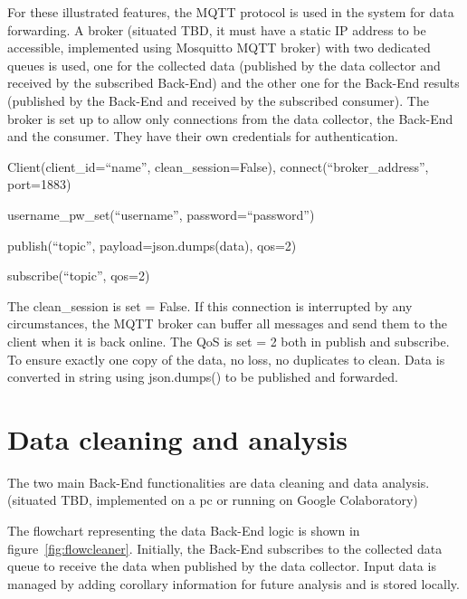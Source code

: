 For these illustrated features, the MQTT protocol is used in the system for data forwarding. A broker (situated TBD, it must have a static IP address to be accessible, implemented using Mosquitto MQTT broker) with two dedicated queues is used, one for the collected data (published by the data collector and received by the subscribed Back-End) and the other one for the Back-End results (published by the Back-End and received by the subscribed consumer).
The broker is set up to allow only connections from the data collector, the Back-End and the consumer. They have their own credentials for authentication.

Client(client\_id=``name'', clean\_session=False), connect(``broker\_address'', port=1883)

username\_pw\_set(``username'', password=``password'')

publish(``topic'', payload=json.dumps(data), qos=2)

subscribe(``topic'', qos=2)

The clean\_session is set = False. If this connection is interrupted by any circumstances, the MQTT broker can buffer all messages and send them to the client when it is back online. The QoS is set = 2 both in publish and subscribe. To ensure exactly one copy of the data, no loss, no duplicates to clean. Data is converted in string using json.dumps() to be published and forwarded.


\section{Data cleaning and analysis}
\label{sec:analysis}
\vspace{0.2 cm} 

The two main Back-End functionalities are data cleaning and data analysis.(situated TBD, implemented on a pc or running on Google Colaboratory)

The flowchart representing the data Back-End logic is shown in figure~\ref{fig:flowcleaner}. Initially, the Back-End subscribes to the collected data queue to receive the data when published by the data collector. Input data is managed by adding corollary information for future analysis and is stored locally.

